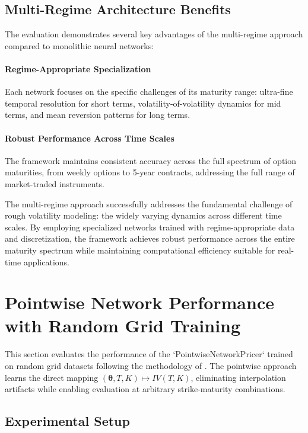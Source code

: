 	\subsection{Multi-Regime Architecture Benefits}
	
	The evaluation demonstrates several key advantages of the multi-regime approach compared to monolithic neural networks:
	
	\paragraph{Regime-Appropriate Specialization}
	Each network focuses on the specific challenges of its maturity range: ultra-fine temporal resolution for short terms, volatility-of-volatility dynamics for mid terms, and mean reversion patterns for long terms.
	
	\paragraph{Robust Performance Across Time Scales}
	The framework maintains consistent accuracy across the full spectrum of option maturities, from weekly options to 5-year contracts, addressing the full range of market-traded instruments.
	
	The multi-regime approach successfully addresses the fundamental challenge of rough volatility modeling: the widely varying dynamics across different time scales. By employing specialized networks trained with regime-appropriate data and discretization, the framework achieves robust performance across the entire maturity spectrum while maintaining computational efficiency suitable for real-time applications.
						
	\section{Pointwise Network Performance with Random Grid Training}
	\label{sec:pointwise-results}
	
	This section evaluates the performance of the `PointwiseNetworkPricer` trained on random grid datasets following the methodology of \citet{Baschetti2024DeepCalibrationRandomGrids}. The pointwise approach learns the direct mapping $(\boldsymbol{\theta}, T, K) \mapsto IV(T, K)$, eliminating interpolation artifacts while enabling evaluation at arbitrary strike-maturity combinations.
	
	\subsection{Experimental Setup}
	
